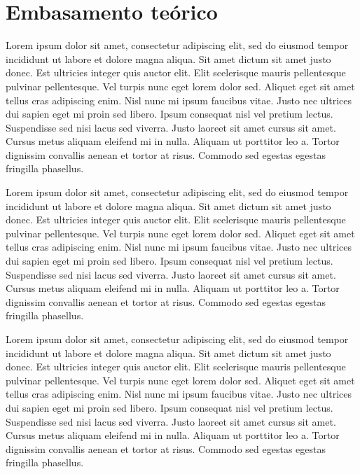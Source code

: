 \documentclass[
  a4paper,
]{report}
\begin{document}
\hypertarget{embasamento-teuxf3rico}{%
\chapter{Embasamento teórico}\label{embasamento-teuxf3rico}}

Lorem ipsum dolor sit amet, consectetur adipiscing elit, sed do eiusmod
tempor incididunt ut labore et dolore magna aliqua. Sit amet dictum sit
amet justo donec. Est ultricies integer quis auctor elit. Elit
scelerisque mauris pellentesque pulvinar pellentesque. Vel turpis nunc
eget lorem dolor sed. Aliquet eget sit amet tellus cras adipiscing enim.
Nisl nunc mi ipsum faucibus vitae. Justo nec ultrices dui sapien eget mi
proin sed libero. Ipsum consequat nisl vel pretium lectus. Suspendisse
sed nisi lacus sed viverra. Justo laoreet sit amet cursus sit amet.
Cursus metus aliquam eleifend mi in nulla. Aliquam ut porttitor leo a.
Tortor dignissim convallis aenean et tortor at risus. Commodo sed
egestas egestas fringilla phasellus.

Lorem ipsum dolor sit amet, consectetur adipiscing elit, sed do eiusmod
tempor incididunt ut labore et dolore magna aliqua. Sit amet dictum sit
amet justo donec. Est ultricies integer quis auctor elit. Elit
scelerisque mauris pellentesque pulvinar pellentesque. Vel turpis nunc
eget lorem dolor sed. Aliquet eget sit amet tellus cras adipiscing enim.
Nisl nunc mi ipsum faucibus vitae. Justo nec ultrices dui sapien eget mi
proin sed libero. Ipsum consequat nisl vel pretium lectus. Suspendisse
sed nisi lacus sed viverra. Justo laoreet sit amet cursus sit amet.
Cursus metus aliquam eleifend mi in nulla. Aliquam ut porttitor leo a.
Tortor dignissim convallis aenean et tortor at risus. Commodo sed
egestas egestas fringilla phasellus.

Lorem ipsum dolor sit amet, consectetur adipiscing elit, sed do eiusmod
tempor incididunt ut labore et dolore magna aliqua. Sit amet dictum sit
amet justo donec. Est ultricies integer quis auctor elit. Elit
scelerisque mauris pellentesque pulvinar pellentesque. Vel turpis nunc
eget lorem dolor sed. Aliquet eget sit amet tellus cras adipiscing enim.
Nisl nunc mi ipsum faucibus vitae. Justo nec ultrices dui sapien eget mi
proin sed libero. Ipsum consequat nisl vel pretium lectus. Suspendisse
sed nisi lacus sed viverra. Justo laoreet sit amet cursus sit amet.
Cursus metus aliquam eleifend mi in nulla. Aliquam ut porttitor leo a.
Tortor dignissim convallis aenean et tortor at risus. Commodo sed
egestas egestas fringilla phasellus.
\end{document}
